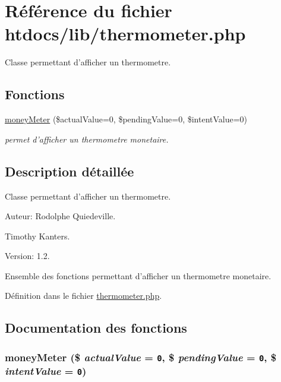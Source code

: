 \hypertarget{thermometer_8php}{
\section{R\'{e}f\'{e}rence du fichier htdocs/lib/thermometer.php}
\label{thermometer_8php}
}
Classe permettant d'afficher un thermometre.  


\subsection*{Fonctions}
\begin{CompactItemize}
\item 
\hyperlink{thermometer_8php_a0}{money\-Meter} (\$actual\-Value=0, \$pending\-Value=0, \$intent\-Value=0)
\begin{CompactList}\small\item\em permet d'afficher un thermometre monetaire. \item\end{CompactList}\end{CompactItemize}


\subsection{Description d\'{e}taill\'{e}e}
Classe permettant d'afficher un thermometre. 

\begin{Desc}
\item[Auteur:]Rodolphe Quiedeville. 

Timothy Kanters. \end{Desc}
\begin{Desc}
\item[Version:]1.2.\end{Desc}
Ensemble des fonctions permettant d'afficher un thermometre monetaire.

D\'{e}finition dans le fichier \hyperlink{thermometer_8php-source}{thermometer.php}.

\subsection{Documentation des fonctions}
\hypertarget{thermometer_8php_a0}{
\subsubsection[moneyMeter]{\setlength{\rightskip}{0pt plus 5cm}money\-Meter (\$ {\em actual\-Value} = {\tt 0}, \$ {\em pending\-Value} = {\tt 0}, \$ {\em intent\-Value} = {\tt 0})}}
\label{thermometer_8php_a0}


